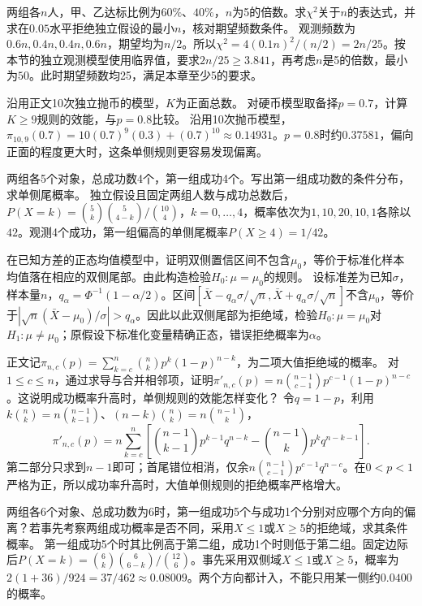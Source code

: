 两组各\(n\)人，甲、乙达标比例为\(60\%\)、\(40\%\)，\(n\)为5的倍数。求\(\chi^2\)关于\(n\)的表达式，并求在\(0.05\)水平拒绝独立假设的最小\(n\)，核对期望频数条件。
\solutionanswer
观测频数为\(0.6n,0.4n,0.4n,0.6n\)，期望均为\(n/2\)。所以\(\chi^2=4(0.1n)^2/(n/2)=2n/25\)。按本节的独立观测模型使用临界值，要求\(2n/25\ge3.841\)，再考虑\(n\)是5的倍数，最小为\(50\)。此时期望频数均25，满足本章至少5的要求。


沿用正文10次独立抛币的模型，\(K\)为正面总数。
对硬币模型取备择\(p=0.7\)，计算\(K\ge9\)规则的效能，与\(p=0.8\)比较。
\solutionanswer
沿用10次抛币模型，\(\pi_{10,9}(0.7)=10(0.7)^9(0.3)+(0.7)^{10}\approx0.14931\)。\(p=0.8\)时约\(0.37581\)，偏向正面的程度更大时，这条单侧规则更容易发现偏离。


两组各5个对象，总成功数4个，第一组成功4个。写出第一组成功数的条件分布，求单侧尾概率。
\solutionanswer
独立假设且固定两组人数与成功总数后，\(P(X=k)=\binom5k\binom5{4-k}/\binom{10}4\)，\(k=0,\ldots,4\)，概率依次为\(1,10,20,10,1\)各除以\(42\)。观测4个成功，第一组偏高的单侧尾概率\(P(X\ge4)=1/42\)。


在已知方差的正态均值模型中，证明双侧置信区间不包含\(\mu_0\)，等价于标准化样本均值落在相应的双侧尾部。由此构造检验\(H_0:\mu=\mu_0\)的规则。
\solutionanswer
设标准差为已知\(\sigma\)，样本量\(n\)，\(q_\alpha=\Phi^{-1}(1-\alpha/2)\)。区间\([\bar X-q_\alpha\sigma/\sqrt n,\bar X+q_\alpha\sigma/\sqrt n]\)不含\(\mu_0\)，等价于\(|\sqrt n(\bar X-\mu_0)/\sigma|>q_\alpha\)。因此以此双侧尾部为拒绝域，检验\(H_0:\mu=\mu_0\)对\(H_1:\mu\ne\mu_0\)；原假设下标准化变量精确正态，错误拒绝概率为\(\alpha\)。


正文记\(\pi_{n,c}(p)=\sum_{k=c}^n\binom nkp^k(1-p)^{n-k}\)，为二项大值拒绝域的概率。
对\(1\le c\le n\)，通过求导与合并相邻项，证明\(\pi'_{n,c}(p)=n\binom{n-1}{c-1}p^{c-1}(1-p)^{n-c}\)。这说明成功概率升高时，单侧规则的效能怎样变化？
\solutionanswer
令\(q=1-p\)，利用\(k\binom nk=n\binom{n-1}{k-1}\)、\((n-k)\binom nk=n\binom{n-1}k\)，
\[
 \pi'_{n,c}(p)=n\sum_{k=c}^n\left[\binom{n-1}{k-1}p^{k-1}q^{n-k}-\binom{n-1}k p^kq^{n-k-1}\right].
\]
第二部分只求到\(n-1\)即可；首尾错位相消，仅余\(n\binom{n-1}{c-1}p^{c-1}q^{n-c}\)。在\(0<p<1\)严格为正，所以成功率升高时，大值单侧规则的拒绝概率严格增大。


两组各6个对象、总成功数为6时，第一组成功5个与成功1个分别对应哪个方向的偏离？若事先考察两组成功概率是否不同，采用\(X\le1\)或\(X\ge5\)的拒绝域，求其条件概率。
\solutionanswer
第一组成功5个时其比例高于第二组，成功1个时则低于第二组。固定边际后\(P(X=k)=\binom6k\binom6{6-k}/\binom{12}6\)。事先采用双侧域\(X\le1\)或\(X\ge5\)，概率为\(2(1+36)/924=37/462\approx0.08009\)。两个方向都计入，不能只用某一侧约\(0.0400\)的概率。
\par
